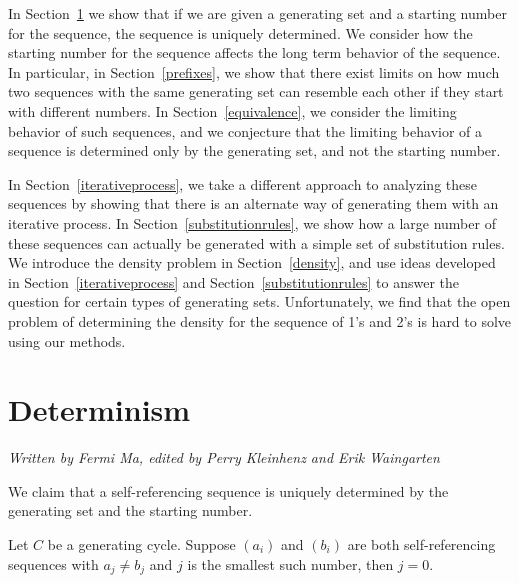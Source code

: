 \documentclass[runningheads,a4paper]{llncs}
\begin{document}
In Section~\ref{determinism} we show that if we are given a generating set and a starting number for the sequence, the sequence is uniquely determined. We consider how the starting number for the sequence affects the long term behavior of the sequence. In particular, in Section~\ref{prefixes}, we show that there exist limits on how much two sequences with the same generating set can resemble each other if they start with different numbers. In Section~\ref{equivalence}, we consider the limiting behavior of such sequences, and we conjecture that the limiting behavior of a sequence is determined only by the generating set, and not the starting number. 

In Section~\ref{iterativeprocess}, we take a different approach to analyzing these sequences by showing that there is an alternate way of generating them with an iterative process. In Section~\ref{substitutionrules}, we show how a large number of these sequences can actually be generated with a simple set of substitution rules. We introduce the density problem in Section~\ref{density}, and use ideas developed in Section~\ref{iterativeprocess} and Section~\ref{substitutionrules} to answer the question for certain types of generating sets. Unfortunately, we find that the open problem of determining the density for the sequence of 1's and 2's is hard to solve using our methods.

\section{Determinism}
\label{determinism}

\emph{Written by Fermi Ma, edited by Perry Kleinhenz and Erik Waingarten}

We claim that a self-referencing sequence is uniquely determined by the generating set and the starting number. 

\begin{lemma}
Let $C$ be a generating cycle. Suppose $(a_i)$ and $(b_i)$ are both self-referencing sequences with $a_j \neq b_j$ and $j$ is the smallest such number, then $j = 0$.
\end{lemma}
\end{document}
